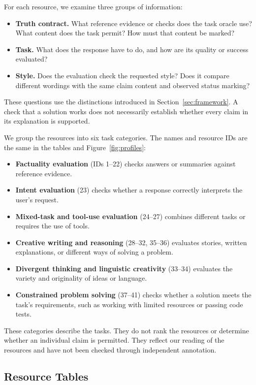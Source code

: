 For each resource, we examine three groups of information:
\begin{itemize}
\item \textbf{Truth contract.} What reference evidence or checks does the task
oracle use? What content does the task permit? How must that content be marked?
\item \textbf{Task.} What does the response have to do, and how are its quality
or success evaluated?
\item \textbf{Style.} Does the evaluation check the requested style? Does it
compare different wordings with the same claim content and observed status
marking?
\end{itemize}
These questions use the distinctions introduced in
Section~\ref{sec:framework}. A check that a solution works does not necessarily
establish whether every claim in its explanation is supported.

We group the resources into six task categories. The names and resource IDs
are the same in the tables and Figure~\ref{fig:profiles}:
\begin{itemize}
\item \textbf{Factuality evaluation} (IDs 1--22) checks answers or summaries
against reference evidence.
\item \textbf{Intent evaluation} (23) checks whether a response correctly
interprets the user's request.
\item \textbf{Mixed-task and tool-use evaluation} (24--27) combines different
tasks or requires the use of tools.
\item \textbf{Creative writing and reasoning} (28--32, 35--36) evaluates
stories, written explanations, or different ways of solving a problem.
\item \textbf{Divergent thinking and linguistic creativity} (33--34)
evaluates the variety and originality of ideas or language.
\item \textbf{Constrained problem solving} (37--41) checks whether a solution
meets the task's requirements, such as working with limited resources or
passing code tests.
\end{itemize}
These categories describe the tasks. They do not rank the resources or
determine whether an individual claim is permitted. They reflect our reading
of the resources and have not been checked through independent annotation.

\subsection{Resource Tables}\label{subsec:resource-tables}

